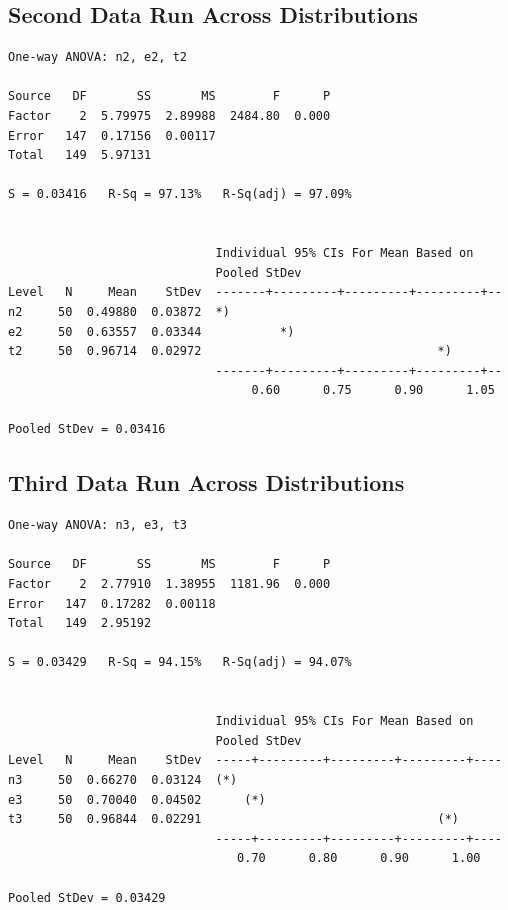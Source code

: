 \documentclass[letterpaper,10pt]{article}
\begin{document}
\subsection{Second Data Run Across Distributions}
\begin{samepage}
\begin{verbatim}
One-way ANOVA: n2, e2, t2 

Source   DF       SS       MS        F      P
Factor    2  5.79975  2.89988  2484.80  0.000
Error   147  0.17156  0.00117
Total   149  5.97131

S = 0.03416   R-Sq = 97.13%   R-Sq(adj) = 97.09%


                             Individual 95% CIs For Mean Based on
                             Pooled StDev
Level   N     Mean    StDev  -------+---------+---------+---------+--
n2     50  0.49880  0.03872  *)
e2     50  0.63557  0.03344           *)
t2     50  0.96714  0.02972                                 *)
                             -------+---------+---------+---------+--
                                  0.60      0.75      0.90      1.05

Pooled StDev = 0.03416
\end{verbatim}
\end{samepage}
\subsection{Third Data Run Across Distributions}
\begin{samepage}
\begin{verbatim}
One-way ANOVA: n3, e3, t3 

Source   DF       SS       MS        F      P
Factor    2  2.77910  1.38955  1181.96  0.000
Error   147  0.17282  0.00118
Total   149  2.95192

S = 0.03429   R-Sq = 94.15%   R-Sq(adj) = 94.07%


                             Individual 95% CIs For Mean Based on
                             Pooled StDev
Level   N     Mean    StDev  -----+---------+---------+---------+----
n3     50  0.66270  0.03124  (*)
e3     50  0.70040  0.04502      (*)
t3     50  0.96844  0.02291                                 (*)
                             -----+---------+---------+---------+----
                                0.70      0.80      0.90      1.00

Pooled StDev = 0.03429
\end{verbatim}
\end{samepage}
\end{document}
